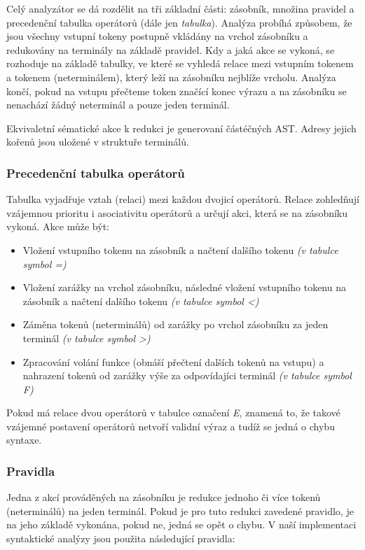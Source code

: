 \documentclass[a4paper,11pt]{article}
\begin{document}
Celý analyzátor se dá rozdělit na tři základní části: zásobník, množina pravidel a precedenční tabulka operátorů (dále jen \textit{tabulka}). Analýza probíhá způsobem, že jsou všechny vstupní tokeny postupně vkládány na vrchol zásobníku a redukovány na terminály na základě pravidel. Kdy a jaká akce se vykoná, se rozhoduje na základě tabulky, ve které se vyhledá relace mezi vstupním tokenem a tokenem (neterminálem), který leží na zásobníku nejblíže vrcholu. Analýza končí, pokud na vstupu přečteme token značící konec výrazu a na zásobníku se nenachází žádný neterminál a pouze jeden terminál. 

Ekvivaletní sématické akce k redukci je generovaní částéčných AST. Adresy jejich kořenů jsou uložené v struktuře terminálů.

\subsubsection{Precedenční tabulka operátorů}
Tabulka vyjadřuje vztah (relaci) mezi každou dvojicí operátorů. Relace zohledňují vzájemnou prioritu i asociativitu operátorů a určují akci, která se na zásobníku vykoná. Akce může být: 
\begin{itemize}
   \item Vložení vstupního tokenu na zásobník a načtení dalšího tokenu \textit{(v tabulce symbol =)}
   \item Vložení zarážky na vrchol zásobníku, následné vložení vstupního tokenu na zásobník a načtení dalšího tokenu \textit{(v tabulce symbol \textless)}
   \item Záměna tokenů (neterminálů) od zarážky po vrchol zásobníku za jeden terminál \textit{(v tabulce symbol \textgreater)}
   \item Zpracování volání funkce (obnáší přečtení dalších tokenů na vstupu) a nahrazení tokenů od zarážky výše za odpovídajíci terminál \textit{(v tabulce symbol F)}
\end{itemize}

Pokud má relace dvou operátorů v tabulce označení \textit{E}, znamená to, že takové vzájemné postavení operátorů netvoří validní výraz a tudíž se jedná o chybu syntaxe.

\subsubsection{Pravidla}
Jedna z akcí prováděných na zásobníku je redukce jednoho či více tokenů (neterminálů) na jeden terminál. Pokud je pro tuto redukci zavedené pravidlo, je na jeho základě vykonána, pokud ne, jedná se opět o chybu. V naší implementaci syntaktické analýzy jsou použita následující pravidla:
\end{document}
